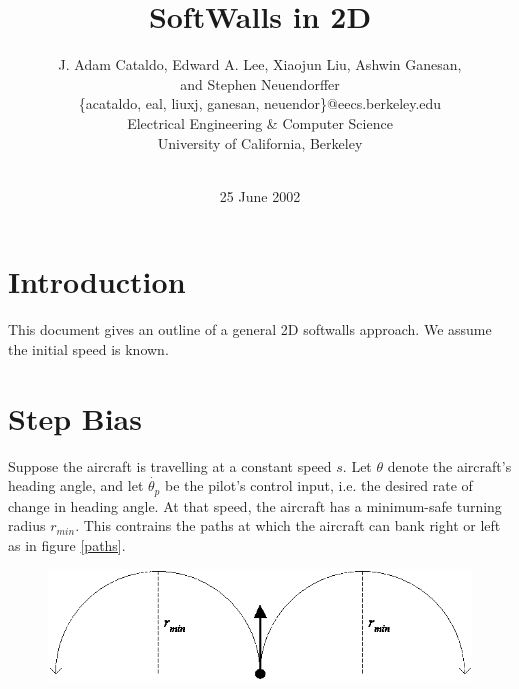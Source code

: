 \documentclass[11pt]{article}
\begin{document}


\title{SoftWalls in 2D}

\author{J. Adam Cataldo, Edward A. Lee, Xiaojun Liu, Ashwin Ganesan,\\
and Stephen Neuendorffer\\ 
\{acataldo, eal, liuxj, ganesan, neuendor\}@eecs.berkeley.edu\\
Electrical Engineering \& Computer Science\\ 
University of California, Berkeley\\ 
\\}

\date{25 June 2002}
\maketitle


\section{Introduction}

This document gives an outline of a general 2D softwalls approach.  We
assume the initial speed is known.



\section{Step Bias}


Suppose the aircraft is travelling at a constant speed $s$.  Let
$\theta$ denote the aircraft's heading angle, and let
$\dot{\theta_{p}}$ be the pilot's control input, i.e. the desired rate
of change in heading angle.  At that speed, the aircraft has a
minimum-safe turning radius $r_{min}$.  This contrains the paths at
which the aircraft can bank right or left as in figure \ref{paths}.

\begin{figure}[btp]
\centering
\includegraphics[width=5in]{aircraftpaths.eps}
\end{figure}
\end{document}
